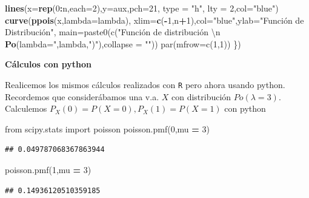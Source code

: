 \documentclass[]{book}
\newenvironment{Shaded}{\begin{snugshade}}{\end{snugshade}}
\newcommand{\DataTypeTok}[1]{\textcolor[rgb]{0.13,0.29,0.53}{#1}}
\newcommand{\DecValTok}[1]{\textcolor[rgb]{0.00,0.00,0.81}{#1}}
\newcommand{\ImportTok}[1]{#1}
\newcommand{\KeywordTok}[1]{\textcolor[rgb]{0.13,0.29,0.53}{\textbf{#1}}}
\newcommand{\NormalTok}[1]{#1}
\newcommand{\OperatorTok}[1]{\textcolor[rgb]{0.81,0.36,0.00}{\textbf{#1}}}
\newcommand{\StringTok}[1]{\textcolor[rgb]{0.31,0.60,0.02}{#1}}
\begin{document}
\begin{Shaded}
\begin{Highlighting}[]
  \KeywordTok{lines}\NormalTok{(}\DataTypeTok{x=}\KeywordTok{rep}\NormalTok{(}\DecValTok{0}\OperatorTok{:}\NormalTok{n,}\DataTypeTok{each=}\DecValTok{2}\NormalTok{),}\DataTypeTok{y=}\NormalTok{aux,}\DataTypeTok{pch=}\DecValTok{21}\NormalTok{, }\DataTypeTok{type =} \StringTok{"h"}\NormalTok{, }\DataTypeTok{lty =} \DecValTok{2}\NormalTok{,}\DataTypeTok{col=}\StringTok{"blue"}\NormalTok{)}
  \KeywordTok{curve}\NormalTok{(}\KeywordTok{ppois}\NormalTok{(x,}\DataTypeTok{lambda=}\NormalTok{lambda),}
        \DataTypeTok{xlim=}\KeywordTok{c}\NormalTok{(}\OperatorTok{-}\DecValTok{1}\NormalTok{,n}\OperatorTok{+}\DecValTok{1}\NormalTok{),}\DataTypeTok{col=}\StringTok{"blue"}\NormalTok{,}\DataTypeTok{ylab=}\StringTok{"Función de Distribución",}
\StringTok{         main=paste0(c("}\NormalTok{Función de distribución \textbackslash{}n }\KeywordTok{Po}\NormalTok{(}\DataTypeTok{lambda=}\StringTok{",lambda,"}\NormalTok{)}\StringTok{"),collapse = ""))}
\StringTok{  par(mfrow=c(1,1))}
\StringTok{\})}
\end{Highlighting}
\end{Shaded}

\textbf{Cálculos con python}

Realicemos los mismos cálculos realizados con \texttt{R} pero ahora usando python. Recordemos que considerábamos una v.a. \(X\) con distribución \(Po(\lambda=3)\). Calculemos \(P_X(0)=P(X=0), P_X(1)=P(X=1)\) con python

\begin{Shaded}
\begin{Highlighting}[]
\ImportTok{from}\NormalTok{ scipy.stats }\ImportTok{import}\NormalTok{ poisson}
\NormalTok{poisson.pmf(}\DecValTok{0}\NormalTok{,mu }\OperatorTok{=} \DecValTok{3}\NormalTok{)}
\end{Highlighting}
\end{Shaded}

\begin{verbatim}
## 0.049787068367863944
\end{verbatim}

\begin{Shaded}
\begin{Highlighting}[]
\NormalTok{poisson.pmf(}\DecValTok{1}\NormalTok{,mu }\OperatorTok{=} \DecValTok{3}\NormalTok{)}
\end{Highlighting}
\end{Shaded}

\begin{verbatim}
## 0.14936120510359185
\end{verbatim}
\end{document}
